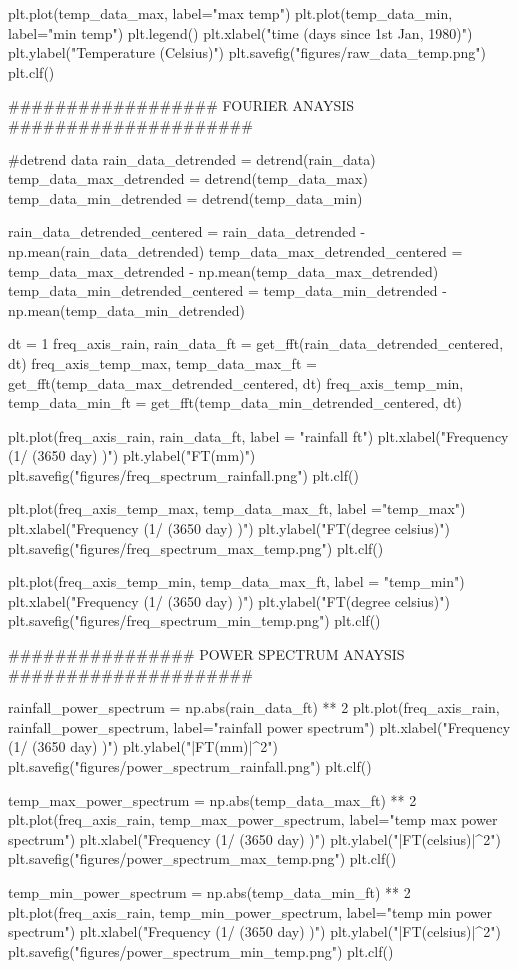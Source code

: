 \documentclass{article}
\begin{document}
\begin{python}
plt.plot(temp_data_max, label="max temp")
plt.plot(temp_data_min, label="min temp")
plt.legend()
plt.xlabel("time (days since 1st Jan, 1980)")
plt.ylabel("Temperature (Celsius)")
plt.savefig("figures/raw_data_temp.png")
plt.clf()

################## FOURIER ANAYSIS #####################

#detrend data
rain_data_detrended = detrend(rain_data)
temp_data_max_detrended = detrend(temp_data_max)
temp_data_min_detrended = detrend(temp_data_min)

rain_data_detrended_centered = rain_data_detrended - np.mean(rain_data_detrended)
temp_data_max_detrended_centered = temp_data_max_detrended - np.mean(temp_data_max_detrended)
temp_data_min_detrended_centered = temp_data_min_detrended - np.mean(temp_data_min_detrended)

dt = 1
freq_axis_rain, rain_data_ft = get_fft(rain_data_detrended_centered, dt)
freq_axis_temp_max, temp_data_max_ft = get_fft(temp_data_max_detrended_centered, dt)
freq_axis_temp_min, temp_data_min_ft = get_fft(temp_data_min_detrended_centered, dt)


plt.plot(freq_axis_rain, rain_data_ft, label = "rainfall ft")
plt.xlabel("Frequency (1/ (3650 day) )")
plt.ylabel("FT(mm)")
plt.savefig("figures/freq_spectrum_rainfall.png")
plt.clf()

plt.plot(freq_axis_temp_max, temp_data_max_ft, label ="temp_max")
plt.xlabel("Frequency (1/ (3650 day) )")
plt.ylabel("FT(degree celsius)")
plt.savefig("figures/freq_spectrum_max_temp.png")
plt.clf()

plt.plot(freq_axis_temp_min, temp_data_max_ft, label = "temp_min")
plt.xlabel("Frequency (1/ (3650 day) )")
plt.ylabel("FT(degree celsius)")
plt.savefig("figures/freq_spectrum_min_temp.png")
plt.clf()

################ POWER SPECTRUM ANAYSIS #####################

rainfall_power_spectrum = np.abs(rain_data_ft) ** 2
plt.plot(freq_axis_rain, rainfall_power_spectrum, label="rainfall power spectrum")
plt.xlabel("Frequency (1/ (3650 day) )")
plt.ylabel("|FT(mm)|^2")
plt.savefig("figures/power_spectrum_rainfall.png")
plt.clf()

temp_max_power_spectrum = np.abs(temp_data_max_ft) ** 2
plt.plot(freq_axis_rain, temp_max_power_spectrum, label="temp max power spectrum")
plt.xlabel("Frequency (1/ (3650 day) )")
plt.ylabel("|FT(celsius)|^2")
plt.savefig("figures/power_spectrum_max_temp.png")
plt.clf()

temp_min_power_spectrum = np.abs(temp_data_min_ft) ** 2
plt.plot(freq_axis_rain, temp_min_power_spectrum, label="temp min power spectrum")
plt.xlabel("Frequency (1/ (3650 day) )")
plt.ylabel("|FT(celsius)|^2")
plt.savefig("figures/power_spectrum_min_temp.png")
plt.clf()


\end{python}
\end{document}
